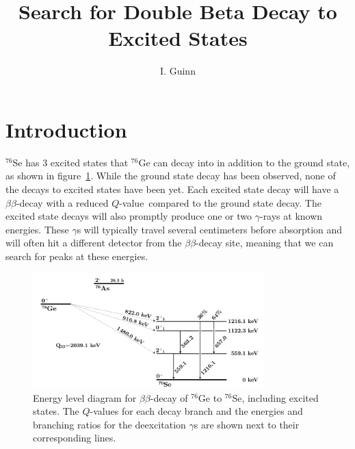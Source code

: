 \documentclass[notitlepage,rmp,aps,10pt]{revtex4-1}
\newcommand{\bb}{${\beta \beta}$}
\newcommand{\Qval}{$Q$-value}
\newcommand{\iso}[2]{$^{#1}$#2}
\newcommand{\Ge}[1]{\iso{#1}{Ge}}
\newcommand{\Se}[1]{\iso{#1}{Se}}
\begin{document}
\graphicspath{{./pics/}{../ch3/pics/}{../ch4/pics/}{../ch5/pics/}{../appAllResults/pics/}{../appSens/pics/}}

\title{Search for Double Beta Decay to Excited States}
\author{I. Guinn}

\pagestyle{uniheader}
\maketitle
\vspace*{-1.5cm}
\tableofcontents
\thispagestyle{uniheader}

\section{Introduction}
\Se{76} has 3 excited states that \Ge{76} can decay into in addition to the ground state, as shown in figure~\ref{fig:Ge76BBLevelDiagram}.
While the ground state decay has been observed, none of the decays to excited states have been yet.
Each excited state decay will have a \bb -decay with a reduced \Qval\ compared to the ground state decay.
The excited state decays will also promptly produce one or two $\gamma$-rays at known energies.
These $\gamma$s will typically travel several centimeters before absorption and will often hit a different detector from the \bb -decay site, meaning that we can search for peaks at these energies.
\\
\begin{figure}[h]
  \centering
  \includegraphics[width=0.8\textwidth]{leveldiagram}
  \caption[Energy level diagram for \Ge{76} \bb to \Se{76}]{\label{fig:Ge76BBLevelDiagram}
    Energy level diagram for \bb-decay of \Ge{76} to \Se{76}, including excited states. The \Qval s for each decay branch and the energies and branching ratios for the deexcitation $\gamma$s are shown next to their corresponding lines.
  }
\end{figure}
\end{document}
